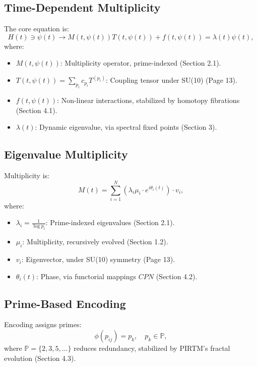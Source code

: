 \documentclass{article}
\theoremstyle{plain}
\begin{document}
\subsection{Time-Dependent Multiplicity}
The core equation is:
\begin{equation}
H(t) \ni \psi(t) \to M(t, \psi(t)) T(t, \psi(t)) + f(t, \psi(t)) = \lambda(t) \psi(t),
\end{equation}
where:
\begin{itemize}
    \item \( M(t, \psi(t)) \): Multiplicity operator, prime-indexed (Section 2.1).
    \item \( T(t, \psi(t)) = \sum_{p_i} c_{p_i} T^{(p_i)} \): Coupling tensor under SU(10) (Page 13).
    \item \( f(t, \psi(t)) \): Non-linear interactions, stabilized by homotopy fibrations (Section 4.1).
    \item \( \lambda(t) \): Dynamic eigenvalue, via spectral fixed points (Section 3).
\end{itemize}

\subsection{Eigenvalue Multiplicity}
Multiplicity is:
\begin{equation}
M(t) = \sum_{i=1}^{N} (\lambda_i \mu_i \cdot e^{i \theta_i(t)}) \cdot v_i,
\end{equation}
where:
\begin{itemize}
    \item \( \lambda_i = \frac{1}{\log p_i} \): Prime-indexed eigenvalues (Section 2.1).
    \item \( \mu_i \): Multiplicity, recursively evolved (Section 1.2).
    \item \( v_i \): Eigenvector, under SU(10) symmetry (Page 13).
    \item \( \theta_i(t) \): Phase, via functorial mappings \( CPN \) (Section 4.2).
\end{itemize}

\subsection{Prime-Based Encoding}
Encoding assigns primes:
\begin{equation}
\phi(p_{ij}) = p_k, \quad p_k \in \mathbb{P},
\end{equation}
where \( \mathbb{P} = \{2, 3, 5, \dots\} \) reduces redundancy, stabilized by PIRTM’s fractal evolution (Section 4.3).
\end{document}
